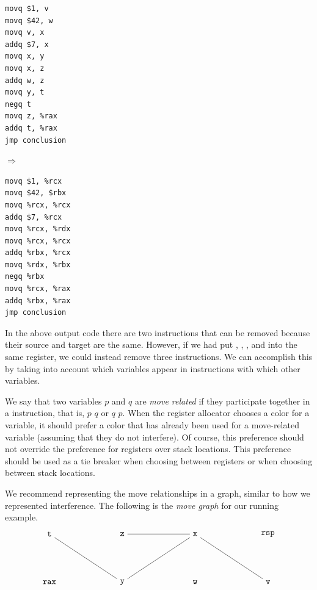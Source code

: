 \documentclass[11pt]{book}
\begin{document}
\begin{minipage}{0.3\textwidth}
\begin{lstlisting}
movq $1, v
movq $42, w
movq v, x
addq $7, x
movq x, y
movq x, z
addq w, z
movq y, t
negq t
movq z, %rax
addq t, %rax
jmp conclusion
\end{lstlisting}
\end{minipage}
$\Rightarrow\qquad$
\begin{minipage}{0.45\textwidth}
\begin{lstlisting}
movq $1, %rcx
movq $42, $rbx
movq %rcx, %rcx
addq $7, %rcx
movq %rcx, %rdx
movq %rcx, %rcx
addq %rbx, %rcx
movq %rdx, %rbx
negq %rbx
movq %rcx, %rax
addq %rbx, %rax
jmp conclusion
\end{lstlisting}
\end{minipage}

In the above output code there are two  instructions that
can be removed because their source and target are the same.  However,
if we had put , , , and  into the same
register, we could instead remove three  instructions.  We
can accomplish this by taking into account which variables appear in
 instructions with which other variables.

We say that two variables $p$ and $q$ are \emph{move
  related} if they participate together in a
 instruction, that is,  $p$\key{,} $q$ or
 $q$\key{,} $p$. When the register allocator chooses a color
for a variable, it should prefer a color that has already been used
for a move-related variable (assuming that they do not interfere). Of
course, this preference should not override the preference for
registers over stack locations. This preference should be used as a
tie breaker when choosing between registers or when choosing between
stack locations.

We recommend representing the move relationships in a graph, similar
to how we represented interference.  The following is the \emph{move
  graph} for our running example.
\[
\begin{tikzpicture}[baseline=(current  bounding  box.center)]
\node (rax) at (0,0) {$\ttm{rax}$};
\node (rsp) at (9,2) {$\ttm{rsp}$};
\node (t) at (0,2) {$\ttm{t}$};
\node (z) at (3,2)  {$\ttm{z}$};
\node (x) at (6,2)  {$\ttm{x}$};
\node (y) at (3,0)  {$\ttm{y}$};
\node (w) at (6,0)  {$\ttm{w}$};
\node (v) at (9,0)  {$\ttm{v}$};

\draw (v) to (x);
\draw (x) to (y);
\draw (x) to (z);
\draw (y) to (t);
\end{tikzpicture}
\]
\end{document}
